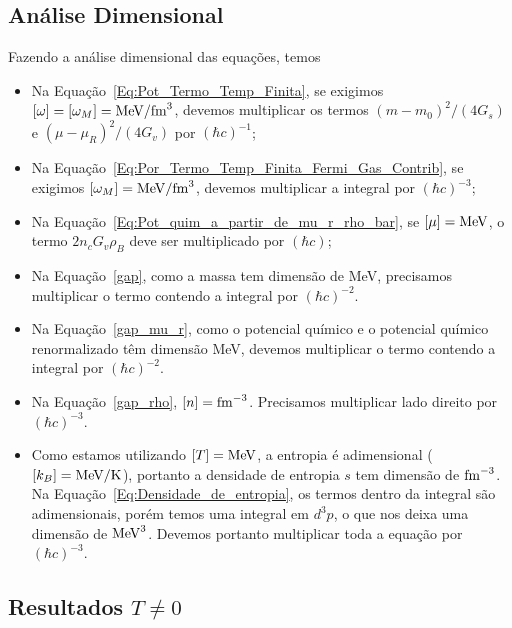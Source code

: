 \subsection{Análise Dimensional}

Fazendo a análise dimensional das equações, temos
\begin{itemize}
	\item Na Equação~\eqref{Eq:Pot_Termo_Temp_Finita}, se exigimos $[\omega] = [\omega_M] = \rm{MeV}/\rm{fm}^3$, devemos multiplicar os termos $(m - m_0)^2/(4G_s)$ e $(\mu - \mu_R)^2/(4G_v)$ por $(\hbar c)^{-1}$;
	\item Na Equação~\eqref{Eq:Por_Termo_Temp_Finita_Fermi_Gas_Contrib}, se exigimos $[\omega_M] = \rm{MeV}/\rm{fm}^3$, devemos multiplicar a integral por $(\hbar c)^{-3}$;
	\item Na Equação~\eqref{Eq:Pot_quim_a_partir_de_mu_r_rho_bar}, se $[\mu] = \rm{MeV}$, o termo $2 n_c G_v \rho_B$ deve ser multiplicado por $(\hbar c)$;
	\item Na Equação~\eqref{gap}, como a massa tem dimensão de MeV, precisamos multiplicar o termo contendo a integral por $(\hbar c)^{-2}$.
	\item Na Equação~\eqref{gap_mu_r}, como o potencial químico e o potencial químico renormalizado têm dimensão MeV, devemos multiplicar o termo contendo a integral por $(\hbar c)^{-2}$.
	\item Na Equação~\eqref{gap_rho}, $[n] = \rm{fm}^{-3}$. Precisamos multiplicar lado direito por $(\hbar c)^{-3}$.
	\item Como estamos utilizando $[T] = \rm{MeV}$, a entropia é adimensional ($[k_B] = \textrm{MeV}/\rm{K}$), portanto a densidade de entropia $s$ tem dimensão de $\rm{fm}^{-3}$. Na Equação~\eqref{Eq:Densidade_de_entropia}, os termos dentro da integral são adimensionais, porém temos uma integral em $d^3p$, o que nos deixa uma dimensão de $\rm{MeV}^3$. Devemos portanto multiplicar toda a equação por $(\hbar c)^{-3}$.
\end{itemize}

\subsection{Resultados $T \neq 0$}


